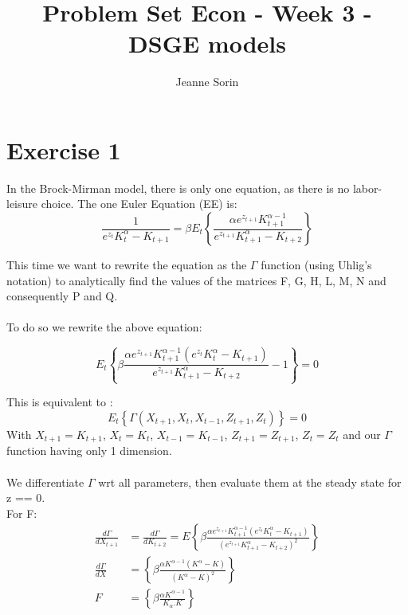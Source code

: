 \documentclass[11pt]{article}
\title{Problem Set Econ - Week 3 - DSGE models}
\author{Jeanne Sorin}
\numberwithin{equation}{section}
\theoremstyle{plain}
\theoremstyle{definition}
\newcommand{\1}{\mathbbm 1}
\def\a{\alpha}
\def\b{\beta}
\begin{document}
\maketitle



\section*{Exercise 1}
In the Brock-Mirman model, there is only one equation, as there is no labor-leisure choice. The one Euler Equation (EE) is:
\begin{equation}
\frac{1}{e^{z_{t}} K_{t}^{\alpha}-K_{t+1}}=\beta E_{t}\left\{\frac{\alpha e^{z_{t+1}} K_{t+1}^{\alpha-1}}{e^{z_{t+1}} K_{t+1}^{\alpha}-K_{t+2}}\right\}
\end{equation}

This time we want to rewrite the equation as the $\Gamma$ function (using Uhlig's notation) to analytically find the values of the matrices F, G, H, L, M, N and consequently P and Q.
\\
\\
To do so we rewrite the above equation:

\begin{equation}
	E_t \left\{\b \frac{ \a e^{z_{t+1}} K_{t+1}^{\a - 1} (e^{z_t} K_t ^\a -K_{t+1})}{e^{z_{t+1}}K_{t+1}^{\a} - K_{t+2}} -1 \right\}= 0
\end{equation}

This is equivalent to :
\begin{equation}
	E_t \left\{\Gamma (X_{t+1}, X_t, X_{t-1}, Z_{t+1}, Z_t) \right\} = 0
\end{equation}
With $X_{t+1} = K_{t+1}$, $X_{t} = K_{t}$, $X_{t-1} = K_{t-1}$, $Z_{t+1} = Z_{t+1}$, $Z_{t} = Z_{t}$ and our $\Gamma$ function having only 1 dimension.
\\
\\
We differentiate $\Gamma$ wrt all parameters, then evaluate them at the steady state for z == 0. \\
For F:
\begin{align}
	\frac{d\Gamma}{d X_{t+1}} &= \frac{d\Gamma}{d K_{t+2}} = E \left\{\b \frac{\a e^{z_{t+1}} K_{t+1}^{\a - 1} (e^{z_t} K_t ^\a -K_{t+1})}{(e^{z_{t+1}}K_{t+1}^{\a} - K_{t+2})^2}
	\right\} \\
	\frac{d\Gamma}{d X} &= \left\{\b \frac{\a K^{\a - 1} (K ^\a -K)}{(K^{\a} - K)^2}
	\right\} \\
	F &=  \left\{\b \frac{\a K^{\a - 1}}{K_\a. K} \right\}
\end{align}
\end{document}

